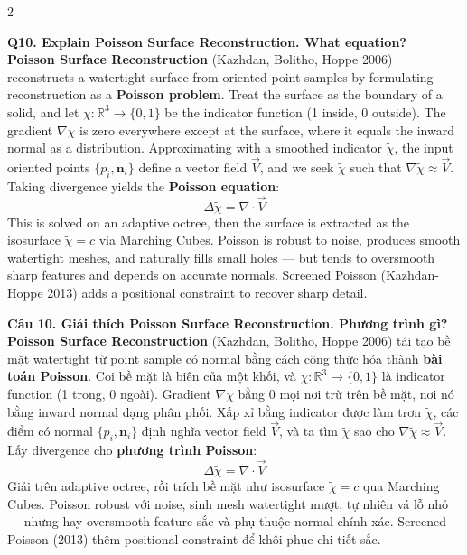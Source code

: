 \begin{paracol}{2}
\switchcolumn*

\textbf{Q10. Explain Poisson Surface Reconstruction. What equation?}\\
\textbf{Poisson Surface Reconstruction} (Kazhdan, Bolitho, Hoppe 2006) reconstructs a watertight surface from oriented point samples by formulating reconstruction as a \textbf{Poisson problem}. Treat the surface as the boundary of a solid, and let $\chi:\mathbb{R}^3\to\{0,1\}$ be the indicator function (1 inside, 0 outside). The gradient $\nabla\chi$ is zero everywhere except at the surface, where it equals the inward normal as a distribution. Approximating with a smoothed indicator $\tilde\chi$, the input oriented points $\{p_i, \mathbf{n}_i\}$ define a vector field $\vec V$, and we seek $\tilde\chi$ such that $\nabla\tilde\chi \approx \vec V$. Taking divergence yields the \textbf{Poisson equation}:
\[
\Delta \tilde\chi = \nabla \cdot \vec V
\]
This is solved on an adaptive octree, then the surface is extracted as the isosurface $\tilde\chi = c$ via Marching Cubes. Poisson is robust to noise, produces smooth watertight meshes, and naturally fills small holes — but tends to oversmooth sharp features and depends on accurate normals. Screened Poisson (Kazhdan-Hoppe 2013) adds a positional constraint to recover sharp detail.

\switchcolumn

\textbf{Câu 10. Giải thích Poisson Surface Reconstruction. Phương trình gì?}\\
\textbf{Poisson Surface Reconstruction} (Kazhdan, Bolitho, Hoppe 2006) tái tạo bề mặt watertight từ point sample có normal bằng cách công thức hóa thành \textbf{bài toán Poisson}. Coi bề mặt là biên của một khối, và $\chi:\mathbb{R}^3\to\{0,1\}$ là indicator function (1 trong, 0 ngoài). Gradient $\nabla\chi$ bằng 0 mọi nơi trừ trên bề mặt, nơi nó bằng inward normal dạng phân phối. Xấp xỉ bằng indicator được làm trơn $\tilde\chi$, các điểm có normal $\{p_i, \mathbf{n}_i\}$ định nghĩa vector field $\vec V$, và ta tìm $\tilde\chi$ sao cho $\nabla\tilde\chi \approx \vec V$. Lấy divergence cho \textbf{phương trình Poisson}:
\[
\Delta \tilde\chi = \nabla \cdot \vec V
\]
Giải trên adaptive octree, rồi trích bề mặt như isosurface $\tilde\chi = c$ qua Marching Cubes. Poisson robust với noise, sinh mesh watertight mượt, tự nhiên vá lỗ nhỏ — nhưng hay oversmooth feature sắc và phụ thuộc normal chính xác. Screened Poisson (2013) thêm positional constraint để khôi phục chi tiết sắc.

\switchcolumn*


\end{paracol}
